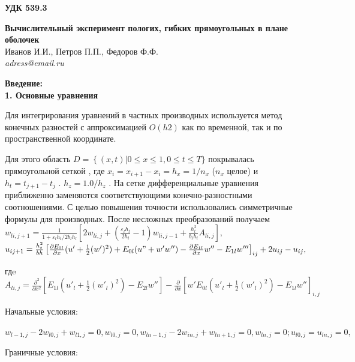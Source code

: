 \documentclass[12pt,letterpaper]{extreport}
\begin{document}
\pagestyle{empty}

\begin{flushright}
{\bfseries \large УДК 539.3}
\end{flushright}

\begin{center}
\textbf{Вычислительный эксперимент пологих, гибких 
прямоугольных в плане оболочек}\\
Иванов И.И., Петров П.П., Федоров Ф.Ф.\\
\textit{adress@email.ru}\\
\end{center}

\textbf{Введение:\\
1.	Основные уравнения}
\par Для интегрирования уравнений в частных производных 
используется метод конечных разностей с аппроксимацией 
$O(h2)$ как по временной, так и по пространственной 
координате. 
\par Для этого область $D=\left\{(x,t)|0\leq x \leq 1 , 
0 \leq t \leq T\} \right. $  покрывалась прямоугольной 
сеткой  , где $x_i =x_{i+1} - x_i=h_x=1/n_x$  ($n_x$  
целое) и $h_t=t_{j+1}-t_j$ . $h_z =1.0/h_z$ . На сетке 
дифференциальные уравнения приближенно заменяются 
соответствующими конечно-разностными соотношениями. С 
целью повышения точности использовались симметричные 
формулы для производных. После несложных преобразований  
получаем\\
$w_{li, j+1}=\frac{1}{1+\varepsilon_l h_t /2b_l h_l} 
\left[2w_{li,j}+(\frac{\varepsilon_l h_t}
{2h_l}-1)w_{li,j-1}+\frac{h_t^2}{b_l h_l}A_{li,j}
\right],$
\\$u_{ij+1}=\frac{h_t^2}{bh}
\left[\frac{\partial E_{0l}}{\partial x}(u'+\frac{1}{2}
(w')^2)+E_{0l}(u"+w'w'')-\frac{\partial E_{1l}}{\partial 
x}w'' - E_{1l}w''' 
\right]_{ij} + 2u_{ij} - u_{ij},$\\
\par гдe\\
$A_{li,j}=\frac{\partial^2}{\partial x^2}\left[E_{1l}
(u'_l + \frac{1}{2}(w'_l)^2)-E_{2l}w''\right] -
\frac{\partial}{\partial x}\left[w'E_{0l}(u'_l +\frac{1}
{2}(w'_l)^2)-E_{1l}w''\right]_{i,j}$\\

\par Начальные условия:

$w_{l-1,j} - 2w_{l0,j} + w_{l1,j} = 0, w_{l0,j} = 0, 
w_{ln-1,j} - 2w_{in,j} + w_{ln+1,j} = 0, w_{ln,j} =0; 
u_{l0, j}= u_{ln,j} = 0, $

\par Граничные условия:
\end{document}
